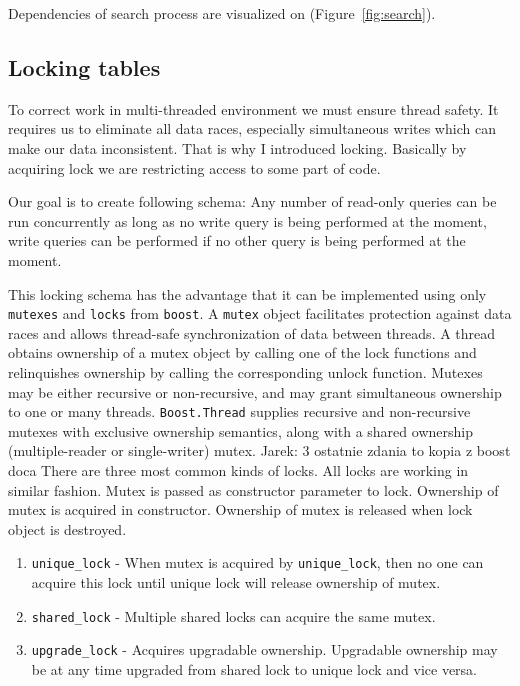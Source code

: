 \documentclass[10pt,a4paper]{article}
\newcommand{\jarek}[1]{\noindent\colorbox{myYellow}{Jarek: #1}}
\begin{document}
Dependencies of search process are visualized on (Figure~\ref{fig:search}).

\subsection{Locking tables}

To correct work in multi-threaded environment we must ensure thread safety. It requires us to eliminate all data races, especially simultaneous writes which can make our data inconsistent. That is why I introduced locking. Basically by acquiring lock we are restricting access to some part of code. 

Our goal is to create following schema: Any number of read-only queries can be run concurrently as long as no write query is being performed at the moment, write queries can be performed if no other query is being performed at the moment. 

This locking schema has the advantage that it can be implemented using only \verb|mutexes| and \verb|locks| from \verb|boost|. A \verb|mutex| object facilitates protection against data races and allows thread-safe synchronization of data between threads. A thread obtains ownership of a mutex object by calling one of the lock functions and relinquishes ownership by calling the corresponding unlock function. Mutexes may be either recursive or non-recursive, and may grant simultaneous ownership to one or many threads. \verb|Boost.Thread| supplies recursive and non-recursive mutexes with exclusive ownership semantics, along with a shared ownership (multiple-reader or single-writer) mutex. \jarek{3 ostatnie zdania to kopia z boost doca}
There are three most common kinds of locks. All locks are working in similar fashion. Mutex is passed as constructor parameter to lock. Ownership of mutex is acquired in constructor. Ownership of mutex is released when lock object is destroyed.  

\begin{enumerate}
\item \verb|unique_lock| - When mutex is acquired by \verb|unique_lock|, then no one can acquire this lock until unique lock will release ownership of mutex. 
\item \verb|shared_lock| - Multiple shared locks can acquire the same mutex.
\item \verb|upgrade_lock| - Acquires upgradable ownership. Upgradable ownership may be at any time upgraded from shared lock to unique lock and vice versa.
\end{enumerate}
\end{document}
